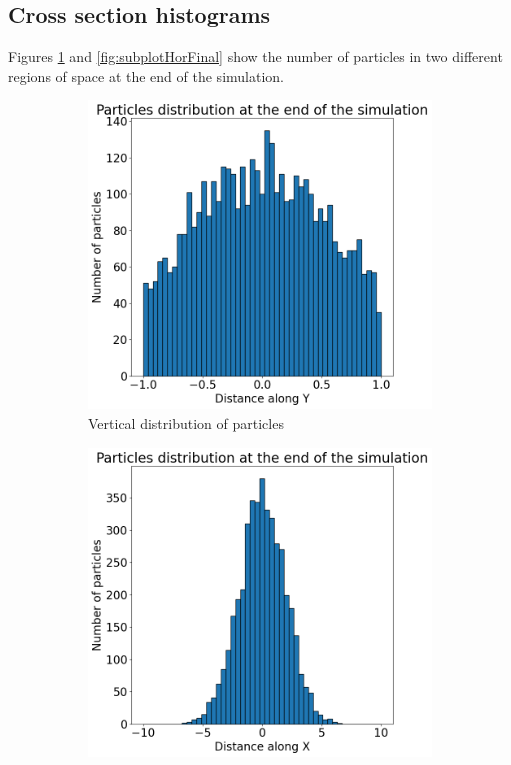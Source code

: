 \documentclass{article}
\begin{document}
\FloatBarrier  %
\subsection{Cross section histograms}
Figures \ref{fig:subplotVertFinal} and \ref{fig:subplotHorFinal} show the number of particles in two different regions of space at the end of the simulation. 
\begin{figure}[htbp]
    \centering
    \begin{subfigure}[b]{0.45\textwidth}
        \centering
        \includegraphics[width=\textwidth]{images/verticalFinalDist.png} %
        \caption{Vertical distribution of particles}
        \label{fig:subplotVertFinal}
    \end{subfigure}
    \hfill
    \begin{subfigure}[b]{0.45\textwidth}
        \centering
        \includegraphics[width=\textwidth]{images/horizontalFinalDist.png} %

\end{subfigure}
\end{figure}
\end{document}
